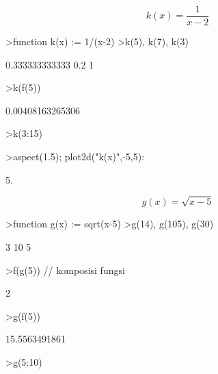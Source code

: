 \documentclass{article}
\begin{document}
\begin{eulernotebook}
\begin{eulercomment}
\begin{eulercomment}
\begin{eulercomment}
\end{eulercomment}
\begin{eulerformula}
\[
k(x)= \frac{1}{x-2}
\]
\end{eulerformula}
\begin{eulerprompt}
>function k(x) := 1/(x-2)
>k(5), k(7), k(3)
\end{eulerprompt}
\begin{euleroutput}
  0.333333333333
  0.2
  1
\end{euleroutput}
\begin{eulerprompt}
>k(f(5))
\end{eulerprompt}
\begin{euleroutput}
  0.00408163265306
\end{euleroutput}
\begin{eulerprompt}
>k(3:15)
\end{eulerprompt}
\begin{euleroutput}
  [1,  0.5,  0.333333,  0.25,  0.2,  0.166667,  0.142857,  0.125,
  0.111111,  0.1,  0.0909091,  0.0833333,  0.0769231]
\end{euleroutput}
\begin{eulerprompt}
>aspect(1.5); plot2d("k(x)",-5,5):
\end{eulerprompt}
\begin{eulercomment}
5.\\
\end{eulercomment}
\begin{eulerformula}
\[
g(x)=\sqrt{x-5}
\]
\end{eulerformula}
\begin{eulerprompt}
>function g(x) := sqrt(x-5)
>g(14), g(105), g(30)
\end{eulerprompt}
\begin{euleroutput}
  3
  10
  5
\end{euleroutput}
\begin{eulerprompt}
>f(g(5)) // komposisi fungsi
\end{eulerprompt}
\begin{euleroutput}
  2
\end{euleroutput}
\begin{eulerprompt}
>g(f(5))
\end{eulerprompt}
\begin{euleroutput}
  15.5563491861
\end{euleroutput}
\begin{eulerprompt}
>g(5:10)
\end{eulerprompt}

\end{eulercomment}
\end{eulercomment}
\end{eulernotebook}
\end{document}
